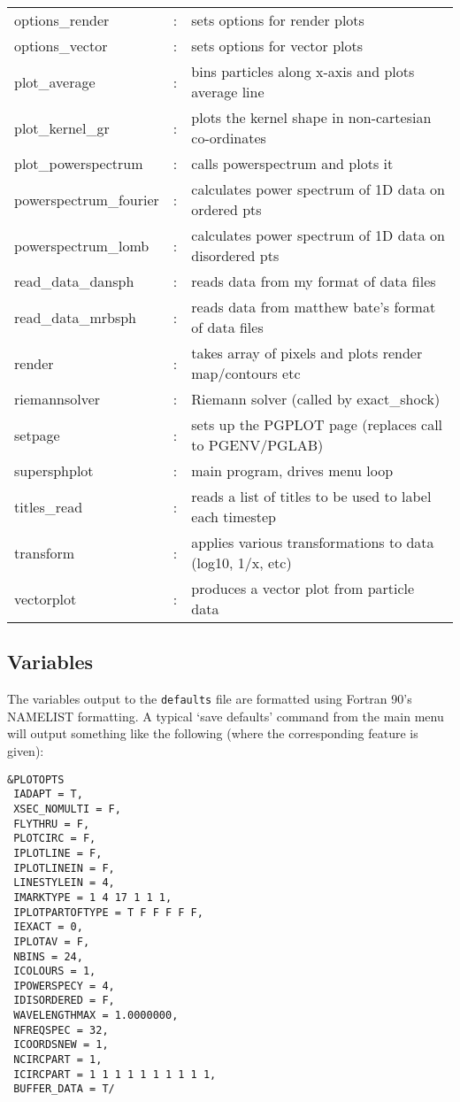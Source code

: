 \documentclass[a4paper,12pt]{article}
\begin{document}
\begin{longtable}{|lcp{}|}
options\_render	 & : & sets options for render plots\\
options\_vector	 & : & sets options for vector plots\\
plot\_average	 & : & bins particles along x-axis and plots average line\\
plot\_kernel\_gr     & : & plots the kernel shape in non-cartesian co-ordinates\\
plot\_powerspectrum & : & calls powerspectrum and plots it\\
powerspectrum\_fourier & : & calculates power spectrum of 1D data on ordered pts\\
powerspectrum\_lomb & : & calculates power spectrum of 1D data on disordered pts\\
read\_data\_dansph   & : & reads data from my format of data files\\
read\_data\_mrbsph   & : & reads data from matthew bate's format of data files\\
render	 	 & : & takes array of pixels and plots render map/contours etc\\
riemannsolver      & : & Riemann solver (called by exact\_shock)\\
setpage            & : & sets up the PGPLOT page (replaces call to PGENV/PGLAB)\\
supersphplot	 & : & main program, drives menu loop\\
titles\_read        & : & reads a list of titles to be used to label each timestep\\
transform	 	 & : & applies various transformations to data (log10, 1/x, etc)\\
vectorplot         & : & produces a vector plot from particle data
\end{longtable}

\subsection{Variables}
\label{sec:variables}
 The variables output to the \verb+defaults+ file are formatted using Fortran 90's NAMELIST
formatting. A typical `save defaults' command from the main menu will output something
like the following (where the corresponding feature is given):
\begin{verbatim}
&PLOTOPTS
 IADAPT = T,
 XSEC_NOMULTI = F,
 FLYTHRU = F,
 PLOTCIRC = F,
 IPLOTLINE = F,
 IPLOTLINEIN = F,
 LINESTYLEIN = 4,
 IMARKTYPE = 1 4 17 1 1 1,
 IPLOTPARTOFTYPE = T F F F F F,
 IEXACT = 0,
 IPLOTAV = F,
 NBINS = 24,
 ICOLOURS = 1,
 IPOWERSPECY = 4,
 IDISORDERED = F,
 WAVELENGTHMAX = 1.0000000,
 NFREQSPEC = 32,
 ICOORDSNEW = 1,
 NCIRCPART = 1,
 ICIRCPART = 1 1 1 1 1 1 1 1 1 1,
 BUFFER_DATA = T/
\end{verbatim}
\end{document}
